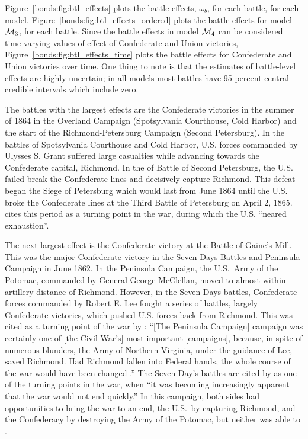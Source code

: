 Figure~\ref{bonds:fig:btl_effects} plots the battle effects, $\omega_{b}$, for each battle, for each model.
Figure~\ref{bonds:fig:btl_effects_ordered} plots the battle effects for model $\mathcal{M}_{\text{3}}$, for each battle.
Since the battle effects in model $\mathcal{M}_{\text{4}}$ can be considered time-varying values of effect of Confederate and Union victories, Figure~\ref{bonds:fig:btl_effects_time} plots the battle effects for Confederate and Union victories over time. 
One thing to note is that the estimates of battle-level effects are highly uncertain; in all models most battles have 95 percent central credible intervals which include zero.

The battles with the largest effects are the Confederate victories in the summer of 1864 in the Overland Campaign (Spotsylvania Courthouse, Cold Harbor) and the start of the Richmond-Petersburg Campaign (Second Petersburg).
In the battles of Spotsylvania Courthouse and Cold Harbor, U.S. forces commanded by Ulysses S. Grant suffered large casualties while advancing towards the Confederate capital, Richmond.
In the of Battle of Second Petersburg, the U.S. failed break the Confederate lines and decisively capture Richmond.
This defeat began the Siege of Petersburg which would last from June 1864 until the U.S. broke the Confederate lines at the Third Battle of Petersburg on April 2, 1865.
\textcite[151-152]{Reiter2009} cites this period as a turning point in the war, during which the U.S. ``neared exhaustion''.

The next largest effect is the Confederate victory at the Battle of Gaine's Mill.
This was the major Confederate victory in the Seven Days Battles and Peninsula Campaign in June 1862.
In the Peninsula Campaign, the U.S.\ Army of the Potomac, commanded by General George McClellan, moved to almost within artillery distance of Richmond.
However, in the Seven Days battles, Confederate forces commanded by Robert E. Lee fought a series of battles, largely Confederate victories, which pushed U.S. forces back from Richmond.
This was cited as a turning point of the war by \textcite{Fuller1942a}: ``[The Peninsula Campaign] campaign was certainly one of [the Civil War's] most important [campaigns], because, in spite of numerous blunders, the Army of Northern Virginia, under the guidance of Lee, saved Richmond. Had Richmond fallen into Federal hands, the whole course of the war would have been changed \parencite[206]{Fuller1942a}.''
The Seven Day's battles are cited by \textcite[145]{Reiter2009} as one of the turning points in the war, when ``it was becoming increasingly apparent that the war would not end quickly.''
In this campaign, both sides had opportunities to bring the war to an end, the U.S.\ by capturing Richmond, and the Confederacy by destroying the Army of the Potomac, but neither was able to \parencite[Chapter6]{Fuller1942a}. 

